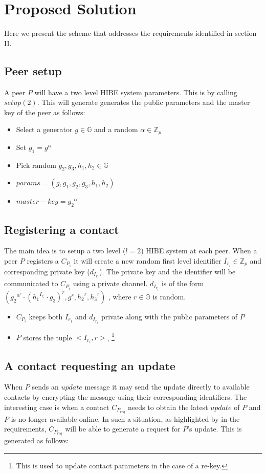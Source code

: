 \section{Proposed Solution}

Here we present the scheme that addresses the requirements identified in section II.

\subsection{Peer setup}
A peer $P$ will have a two level HIBE system parameters. This is by calling $setup(2)$.
This will generate generates the public parameters and the master key of the peer as follows:
\begin{itemize}
	\item Select a generator $g \in \mathbb{G}$ and a random $\alpha \in \mathbb{Z}_p$
	\item Set $g_1 = g^{\alpha}$
	\item Pick random $g_2, g_3, h_1, h_2 \in \mathbb{G}$
	\item $params = (g, g_1, g_2, g_3, h_1, h_2)$
	\item $master-key = {g_2}^{\alpha}$
\end{itemize}


\subsection{Registering a contact}

The main idea is to setup a two level ($l=2$) HIBE system at each peer. When a peer $P$ registers a $C_{P_i}$ it will create a new random first level identifier $I_{r_i} \in \mathbb{Z}_p$ and corresponding private key ($d_{I_{r_i}}$). The private key and the identifier will be communicated to $C_{P_i}$ using a private channel. $d_{I_{r_i}}$ is of the form
$({{g_2}^{\alpha'}} \cdot {({{h_1}^{I_{r_i}}} \cdot {g_3} )}^r , g^r, {h_2}^r, {h_3}^r)$ ,
where $r \in \mathbb{G}$ is random.

\begin{itemize}
\item $C_{P_i}$ keeps both $I_{r_1}$ and $d_{I_{r_1}}$ private along with the public parameters of $P$
\item $P$ stores the tuple $<I_{r_i}, r>$, \footnote {This is used to update contact parameters in the case of a re-key.}
\end{itemize}


\subsection{A contact requesting an update}
When $P$ sends an $update$ message it may send the update directly to available contacts by encrypting the message using their corresponding identifiers. The interesting case is when a contact $C_{P_{req}}$ needs to obtain the latest $update$ of $P$ and $P$ is no longer available online. In such a situation, as highlighted by in the requirements, $C_{P_{req}}$ will be able to generate a request for $P$'s update. This is generated as follows:


